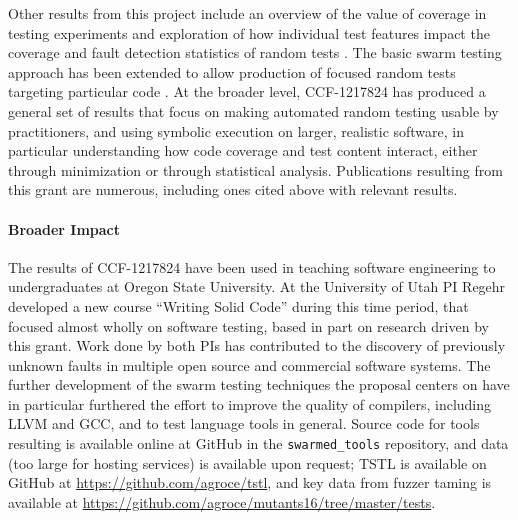 Other results from this project include an overview of the value of coverage in
testing experiments \cite{Onward14} and exploration of how individual
test features impact the coverage and fault detection statistics of
random tests \cite{helphelp}.  The basic swarm testing approach has
been extended to allow production of focused random tests targeting
particular code \cite{DirectedSwarm}.  At the broader level, CCF-1217824 has
produced a general set of results that focus on making automated random
testing usable by practitioners, and using symbolic execution on
larger, realistic software, in particular understanding how code
coverage and test content interact, either through minimization or
through statistical analysis.  Publications resulting from this grant
are numerous, including ones 
\cite{Onward14,PLDI13,issta14,icst2014,helphelp,DirectedSwarm,stvrcausereduce,tstlsttt,ISSTA15,ASEAdeq} cited above with relevant results.

\paragraph{Broader Impact}

The results of CCF-1217824 have been used in teaching software
engineering to undergraduates at Oregon State University. At
the University of Utah PI Regehr developed a new course ``Writing
Solid Code'' during this time period, that focused almost wholly
on software testing, based in part on research driven by this
grant.
%
Work done by both PIs has contributed to the discovery of previously
unknown faults in multiple open source and commercial software
systems.  The further development of the swarm testing techniques the
proposal centers on have in particular furthered the effort to improve
the quality of compilers, including LLVM and GCC, and to test language
tools in general\cite{ZhendongPLDI14,beginnerluck,dewey2015fuzzing,le2015randomized}.
Source code for tools resulting is available online at GitHub in the
{\tt swarmed\_tools} repository, and data (too large for hosting
services) is available upon request; TSTL is available on GitHub at
\url{https://github.com/agroce/tstl}, and key data from fuzzer taming
is available at \url{https://github.com/agroce/mutants16/tree/master/tests}.



